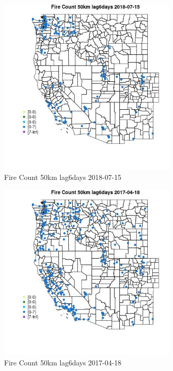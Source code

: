\begin{figure} 
\centering  
\includegraphics[width=0.77\textwidth]{Code_Outputs/Report_ML_input_PM25_Step4_part_e_de_duplicated_aves_compiled_2019-05-20wNAs_MapObsFire_Count_50km_lag6days2018-07-15.jpg} 
\caption{\label{fig:Report_ML_input_PM25_Step4_part_e_de_duplicated_aves_compiled_2019-05-20wNAsMapObsFire_Count_50km_lag6days2018-07-15}Fire Count 50km lag6days 2018-07-15} 
\end{figure} 
 

\begin{figure} 
\centering  
\includegraphics[width=0.77\textwidth]{Code_Outputs/Report_ML_input_PM25_Step4_part_e_de_duplicated_aves_compiled_2019-05-20wNAs_MapObsFire_Count_50km_lag6days2017-04-18.jpg} 
\caption{\label{fig:Report_ML_input_PM25_Step4_part_e_de_duplicated_aves_compiled_2019-05-20wNAsMapObsFire_Count_50km_lag6days2017-04-18}Fire Count 50km lag6days 2017-04-18} 
\end{figure} 
 


